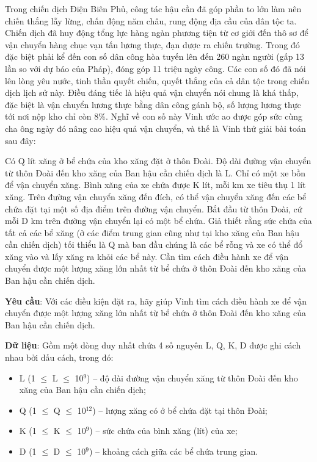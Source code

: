 

Trong chiến dịch Điện Biên Phủ, công tác hậu cần đã góp phần to lớn làm nên chiến thắng lẫy lừng, chấn động năm châu, rung động địa cầu của dân tộc ta. Chiến dịch đã huy động tổng lực hàng ngàn phương tiện từ cơ giới đến thô sơ để vận chuyển hàng chục vạn tấn lương thực, đạn dược ra chiến trường. Trong đó đặc biệt phải kể đến con số dân công hòa tuyến lên đến 260 ngàn người (gấp 13 lần so với dự báo của Pháp), đóng góp 11 triệu ngày công. Các con số đó đã nói lên lòng yêu nước, tinh thần quyết chiến, quyết thắng của cả dân tộc trong chiến dịch lịch sử này. Điều đáng tiếc là hiệu quả vận chuyển nói chung là khá thấp, đặc biệt là vận chuyển lương thực bằng dân công gánh bộ, số lượng lương thực tới nơi nộp kho chỉ còn 8\%. Nghĩ về con số này Vinh ước ao được góp sức cùng cha ông ngày đó nâng cao hiệu quả vận chuyển, và thế là Vinh thử giải bài toán sau đây:

Có Q lít xăng ở bể chứa của kho xăng đặt ở thôn Đoài. Độ dài đường vận chuyển từ thôn Đoài đến kho xăng của Ban hậu cần chiến dịch là L. Chỉ có một xe bồn để vận chuyển xăng. Bình xăng của xe chứa được K lít, mỗi km xe tiêu thụ 1 lít xăng. Trên đường vận chuyển xăng đến đích, có thể vận chuyển xăng đến các bể chứa đặt tại một số địa điểm trên đường vận chuyển. Bắt đầu từ thôn Đoài, cứ mỗi D km trên đường vận chuyển lại có một bể chứa. Giả thiết rằng sức chứa của tất cả các bể xăng (ở các điểm trung gian cũng như tại kho xăng của Ban hậu cần chiến dịch) tối thiểu là Q mà ban đầu chúng là các bể rỗng và xe có thể đổ xăng vào và lấy xăng ra khỏi các bể này. Cần tìm cách điều hành xe để vận chuyển được một lượng xăng lớn nhất từ bể chứa ở thôn Đoài đến kho xăng của Ban hậu cần chiến dịch.

\textbf{Yêu cầu}: Với các điều kiện đặt ra, hãy giúp Vinh tìm cách điều hành xe để vận chuyển được một lượng xăng lớn nhất từ bể chứa ở thôn Đoài đến kho xăng của Ban hậu cần chiến dịch.

\textbf{Dữ liệu}: Gồm một dòng duy nhất chứa 4 số nguyên L, Q, K, D được ghi cách nhau bởi dấu cách, trong đó:
\begin{itemize}
	\item L (1  $\le$  L  $\le$  10$^9$) – độ dài đường vận chuyển xăng từ thôn Đoài đến kho xăng của Ban hậu cần chiến dịch;
	\item Q (1  $\le$  Q  $\le$  10$^12$) – lượng xăng có ở bể chứa đặt tại thôn Đoài;
	\item K (1  $\le$  K  $\le$  10$^9$) – sức chứa của bình xăng (lít) của xe;
	\item D (1  $\le$  D  $\le$  10$^9$) – khoảng cách giữa các bể chứa trung gian.
\end{itemize}

